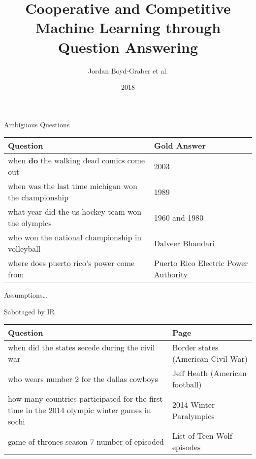 \documentclass[xcolor=table]{beamer}
\title[HCQA]{Cooperative and Competitive Machine Learning through Question Answering}
\author{ Jordan Boyd-Graber et al.}
\date{2018}
\institute[Maryland] %
{University of Maryland}
\begin{document}



\begin{frame}{Ambiguous Questions}
  \begin{small}
  \begin{tabular}{p{7cm}p{3cm}}
    \toprule
    Question & Gold Answer \\
    \hline
    \alert<1>{when {\bf do} the walking dead comics come out} & 2003 \\
    \alert<2>{when was the last time michigan won the championship} & 1989 \\
    \alert<3>{what year did the us hockey team won the olympics} & 1960 and 1980 \\
    \alert<4>{who won the national championship in volleyball} & Dalveer Bhandari \\
    \alert<5>{where does puerto rico's power come from} & Puerto Rico Electric Power Authority \\
    \bottomrule
  \end{tabular}
  \end{small}
  \begin{block}{Assumptions\dots}
  \end{block}
\end{frame}

\begin{frame}{Sabotaged by IR}

  \begin{small}
  \begin{tabular}{p{7cm}p{3cm}}
    \toprule
    Question & Page \\
    \hline
 when did the states secede during the civil war &  Border states (American Civil War) \\
 who wears number 2 for the dallas cowboys &  Jeff Heath (American football) \\
 how many countries participated for the first time in the 2014 olympic winter games in sochi & 2014 Winter Paralympics \\
 game of thrones season 7 number of episoded &  List of Teen Wolf episodes \\
 \bottomrule
  \end{tabular}
  \end{small}

\end{frame}
\end{document}
